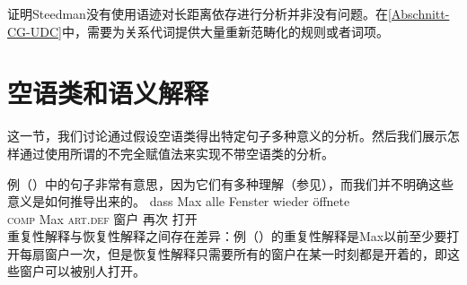  \citet{Pollard88a}证明Steedman没有使用语迹对长距离依存进行分析并非没有问题。在\ref{Abschnitt-CG-UDC}中，需要为关系代词提供大量重新范畴化的规则或者词项。

\section{空语类和语义解释}
\label{Abschnitt-leere-Elemente-Semantik}
\label{sec-MRS-wieder}

这一节，我们讨论通过假设空语类得出特定句子多种意义的分析。然后我们展示怎样通过使用所谓的不完全赋值法来实现不带空语类的分析。

例（）中的句子非常有意思，因为它们有多种理解（参见\citet[\S~5.6]{Dowty79a}），而我们并不明确这些意义是如何推导出来的。
\ea
\label{ex-alle-wieder}
\gll dass Max alle Fenster wieder öffnete\\
	 \textsc{comp} Max \textsc{art}.\textsc{def} 窗户 再次 打开\\
\z
重复性解释与恢复性解释之间存在差异：例（）的重复性解释是Max以前至少要打开每扇窗户一次，但是恢复性解释只需要所有的窗户在某一时刻都是开着的，即这些窗户可以被别人打开。

